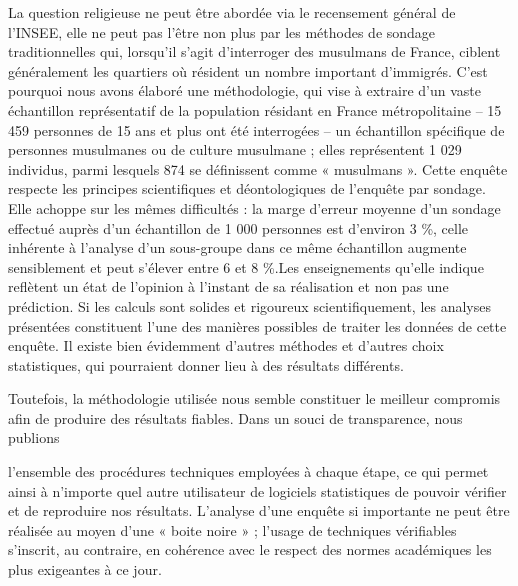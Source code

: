 La question religieuse ne peut être abordée via le recensement général
de l'INSEE, elle ne peut pas l'être non plus par les méthodes de sondage
traditionnelles qui, lorsqu'il s'agit d'interroger des musulmans de
France, ciblent généralement les quartiers où résident un nombre
important d'immigrés. C'est pourquoi nous avons élaboré une
méthodologie, qui vise à extraire d'un vaste échantillon représentatif
de la population résidant en France métropolitaine -- 15 459 personnes
de 15 ans et plus ont été interrogées -- un échantillon spécifique de
personnes musulmanes ou de culture musulmane ; elles représentent 1 029
individus, parmi lesquels 874 se définissent comme « musulmans ». Cette
enquête respecte les principes scientifiques et déontologiques de
l'enquête par sondage. Elle achoppe sur les mêmes difficultés : la marge
d'erreur moyenne d'un sondage effectué auprès d'un échantillon de 1 000
personnes est d'environ 3 \%, celle inhérente à l'analyse d'un
sous-groupe dans ce même échantillon augmente sensiblement et peut
s'élever entre 6 et 8 \%.Les enseignements qu'elle indique reflètent un
état de l'opinion à l'instant de sa réalisation et non pas une
prédiction. Si les calculs sont solides et rigoureux scientifiquement,
les analyses présentées constituent l'une des manières possibles de
traiter les données de cette enquête. Il existe bien évidemment d'autres
méthodes et d'autres choix statistiques, qui pourraient donner lieu à
des résultats différents.

Toutefois, la méthodologie utilisée nous semble constituer le meilleur
compromis afin de produire des résultats fiables. Dans un souci de
transparence, nous publions

l'ensemble des procédures techniques employées à chaque étape, ce qui
permet ainsi à n'importe quel autre utilisateur de logiciels
statistiques de pouvoir vérifier et de reproduire nos résultats.
L'analyse d'une enquête si importante ne peut être réalisée au moyen
d'une « boite noire » ; l'usage de techniques vérifiables s'inscrit, au
contraire, en cohérence avec le respect des normes académiques les plus
exigeantes à ce jour.

